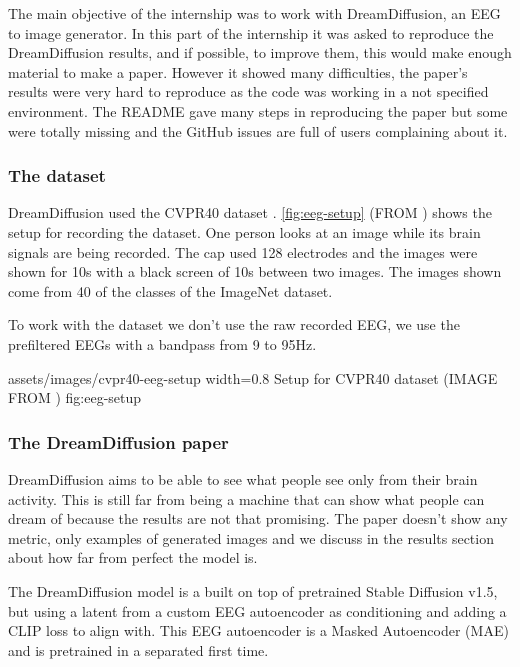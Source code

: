 The main objective of the internship was to work with
DreamDiffusion\cite{dreamdiffusion}, an EEG to image generator. In this part of
the internship it was asked to reproduce the DreamDiffusion results, and if
possible, to improve them, this would make enough material to make a paper.
However it showed many difficulties, the paper's results were very hard to
reproduce as the code was working in a not specified environment. The README
gave many steps in reproducing the paper but some were totally missing and the
GitHub issues are full of users complaining about it.

\subsubsection{The dataset}

DreamDiffusion used the CVPR40 dataset
\cite{CVPR40-1}\cite{CVPR40-2}\cite{CVPR40link}. \cref{fig:eeg-setup} (FROM
\cite{CVPR40-2}) shows the setup for recording the dataset. One person looks at
an image while its brain signals are being recorded. The cap used 128 electrodes
and the images were shown for 10s with a black screen of 10s between two images.
The images shown come from 40 of the classes of the ImageNet dataset.

To work with the dataset we don't use the raw recorded EEG, we use the
prefiltered EEGs with a bandpass from 9 to 95Hz.

\insertfigure
    {assets/images/cvpr40-eeg-setup}
    {width=0.8\textwidth}
    {Setup for CVPR40 dataset (IMAGE FROM \cite{CVPR40-2})}
    {fig:eeg-setup}

\subsubsection{The DreamDiffusion paper}

DreamDiffusion aims to be able to see what people see only from their brain
activity. This is still far from being a machine that can show what people can
dream of because the results are not that promising. The paper doesn't show any
metric, only examples of generated images and we discuss in the results section
about how far from perfect the model is.

The DreamDiffusion model is a built on top of pretrained Stable Diffusion
v1.5\cite{stable-diffusion}, but using a latent from a custom EEG autoencoder as
conditioning and adding a CLIP loss to align with. This EEG autoencoder is a
Masked Autoencoder (MAE) and is pretrained in a separated first time.

